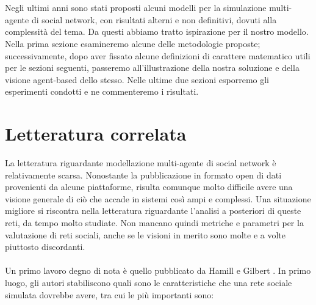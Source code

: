 \documentclass[a4paper,12pt]{article}
\begin{document}
\\
\\
Negli ultimi anni sono stati proposti alcuni modelli per la simulazione multi-agente di social network, con risultati alterni e non definitivi, dovuti alla complessità del tema. Da questi abbiamo tratto ispirazione per il nostro modello. Nella prima sezione esamineremo alcune delle metodologie proposte; successivamente, dopo aver fissato alcune definizioni di carattere matematico utili per le sezioni seguenti, passeremo all'illustrazione della nostra soluzione e della visione agent-based dello stesso. Nelle ultime due sezioni esporremo gli esperimenti condotti e ne commenteremo i risultati.
\newpage
\section{Letteratura correlata}
\label{sec:letteratura}
La letteratura riguardante modellazione multi-agente di social network è relativamente scarsa. Nonostante la pubblicazione in formato open di dati provenienti da alcune piattaforme, risulta comunque molto difficile avere una visione generale di ciò che accade in sistemi così ampi e complessi. Una situazione migliore si riscontra nella letteratura riguardante l'analisi a posteriori di queste reti, da tempo molto studiate. Non mancano quindi metriche e parametri per la valutazione di reti sociali, anche se le visioni in merito sono molte e a volte piuttosto discordanti.\\
\\
Un primo lavoro degno di nota è quello pubblicato da Hamill e Gilbert \cite{gilbert}. In primo luogo, gli autori stabiliscono quali sono le caratteristiche che una rete sociale simulata dovrebbe avere, tra cui le più importanti sono:
\end{document}
